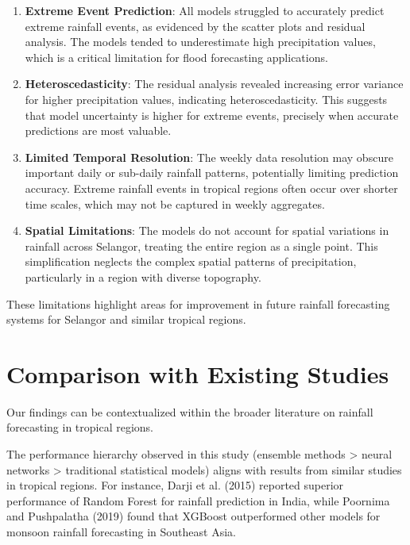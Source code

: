 \documentclass[12pt]{article}
\begin{document}
\begin{enumerate}
    \item \textbf{Extreme Event Prediction}: All models struggled to accurately predict extreme rainfall events, as evidenced by the scatter plots and residual analysis. The models tended to underestimate high precipitation values, which is a critical limitation for flood forecasting applications.
    
    \item \textbf{Heteroscedasticity}: The residual analysis revealed increasing error variance for higher precipitation values, indicating heteroscedasticity. This suggests that model uncertainty is higher for extreme events, precisely when accurate predictions are most valuable.
    
    \item \textbf{Limited Temporal Resolution}: The weekly data resolution may obscure important daily or sub-daily rainfall patterns, potentially limiting prediction accuracy. Extreme rainfall events in tropical regions often occur over shorter time scales, which may not be captured in weekly aggregates.
    
    \item \textbf{Spatial Limitations}: The models do not account for spatial variations in rainfall across Selangor, treating the entire region as a single point. This simplification neglects the complex spatial patterns of precipitation, particularly in a region with diverse topography.
\end{enumerate}

These limitations highlight areas for improvement in future rainfall forecasting systems for Selangor and similar tropical regions.

\section{Comparison with Existing Studies}
\label{sec:comparison_studies}

Our findings can be contextualized within the broader literature on rainfall forecasting in tropical regions.

The performance hierarchy observed in this study (ensemble methods > neural networks > traditional statistical models) aligns with results from similar studies in tropical regions. For instance, Darji et al. (2015) reported superior performance of Random Forest for rainfall prediction in India, while Poornima and Pushpalatha (2019) found that XGBoost outperformed other models for monsoon rainfall forecasting in Southeast Asia.
\end{document}
